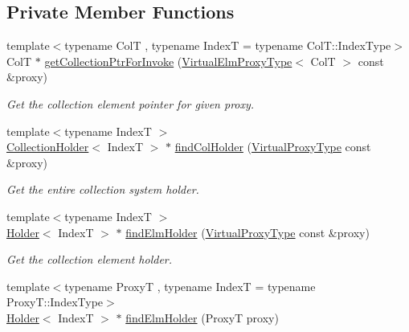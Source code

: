 \subsection*{Private Member Functions}
\begin{DoxyCompactItemize}
\item 
{\footnotesize template$<$typename ColT , typename IndexT  = typename Col\+T\+::\+Index\+Type$>$ }\\ColT $\ast$ \hyperlink{structvt_1_1vrt_1_1collection_1_1_collection_manager_a4f8a7ea0fd5e1a67a7d0d7a1987fcfa1}{get\+Collection\+Ptr\+For\+Invoke} (\hyperlink{namespacevt_1_1vrt_a620a5c8c59d13e513f690c74b4af516f}{Virtual\+Elm\+Proxy\+Type}$<$ ColT $>$ const \&proxy)
\begin{DoxyCompactList}\small\item\em Get the collection element pointer for given proxy. \end{DoxyCompactList}\item 
{\footnotesize template$<$typename IndexT $>$ }\\\hyperlink{structvt_1_1vrt_1_1collection_1_1_collection_holder}{Collection\+Holder}$<$ IndexT $>$ $\ast$ \hyperlink{structvt_1_1vrt_1_1collection_1_1_collection_manager_ad27604b811c2e8e5734c8dcfb772f1cb}{find\+Col\+Holder} (\hyperlink{namespacevt_a1b417dd5d684f045bb58a0ede70045ac}{Virtual\+Proxy\+Type} const \&proxy)
\begin{DoxyCompactList}\small\item\em Get the entire collection system holder. \end{DoxyCompactList}\item 
{\footnotesize template$<$typename IndexT $>$ }\\\hyperlink{structvt_1_1vrt_1_1collection_1_1_holder}{Holder}$<$ IndexT $>$ $\ast$ \hyperlink{structvt_1_1vrt_1_1collection_1_1_collection_manager_a68b1f940a90a063268c1de9b2d16a02c}{find\+Elm\+Holder} (\hyperlink{namespacevt_a1b417dd5d684f045bb58a0ede70045ac}{Virtual\+Proxy\+Type} const \&proxy)
\begin{DoxyCompactList}\small\item\em Get the collection element holder. \end{DoxyCompactList}\item 
{\footnotesize template$<$typename ProxyT , typename IndexT  = typename Proxy\+T\+::\+Index\+Type$>$ }\\\hyperlink{structvt_1_1vrt_1_1collection_1_1_holder}{Holder}$<$ IndexT $>$ $\ast$ \hyperlink{structvt_1_1vrt_1_1collection_1_1_collection_manager_a9358387d86de8983cdbf3db982da7041}{find\+Elm\+Holder} (ProxyT proxy)

\end{DoxyCompactItemize}
